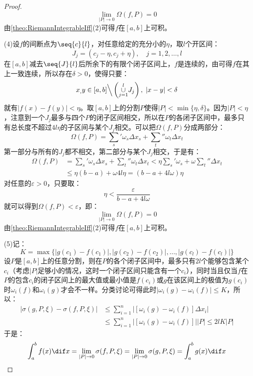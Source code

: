 \begin{proof}
\begin{equation*}
		\lim_{|P|\to0}\Omega(f,P)=0
	\end{equation*}
	由\cref{theo:RiemannIntegrableIff}(2)可得$f$在$[a,b]$上可积。\par
	(4)设$f$的间断点为$\seq{c}{l}$，对任意给定的充分小的$\eta$，取$l$个开区间：
	\begin{equation*}
		J_j=(c_j-\eta,c_j+\eta),\quad j=1,2,\dots,l
	\end{equation*}
	在$[a,b]$减去$\seq{J}{l}$后所余下的有限个闭子区间上，$f$是连续的，由可得$f$在其上一致连续，所以存在$\delta>0$，使得只要：
	\begin{equation*}
		x_,y\in[a,b]\Big\backslash\left(\underset{j=1}{\overset{l}{\cup}}J_j\right),\;|x-y|<\delta
	\end{equation*}
	就有$|f(x)-f(y)|<\eta$。取$[a,b]$上的分割$P$使得$|P|<\min\{\eta,\delta\}$。因为$|P|<\eta$，注意到一个$J_j$最多与四个$P$的闭子区间相交，所以在$P$的各闭子区间中，最多只有总长度不超过$4l\eta$的子区间与某个$J_j$相交。可以把$\Omega(f,P)$分成两部分：
	\begin{equation*}
		\Omega(f,P)=\sum_s'\omega_s\Delta x_s+\sum_t''\omega_t\Delta x_t
	\end{equation*}
	第一部分与所有的$J_j$都不相交，第二部分与某个$J_j$相交，于是有：
	\begin{align*}
		\Omega(f,P)&=\sum_s'\omega_s\Delta x_s+\sum_t''\omega_t\Delta x_t<\eta\sum_{s}'\omega_s+\omega\sum_{t}''\Delta x_t \\
		&\leqslant\eta(b-a)+\omega4l\eta=(b-a+4l\omega)\eta
	\end{align*}
	对任意的$\varepsilon>0$，只要取：
	\begin{equation*}
		\eta<\frac{\varepsilon}{b-a+4l\omega}
	\end{equation*}
	就可以得到$\Omega(f,P)<\varepsilon$，即：
	\begin{equation*}
		\lim_{|P|\to0}\Omega(f,P)=0
	\end{equation*}
	由\cref{theo:RiemannIntegrableIff}(2)可得$f$在$[a,b]$上可积。\par
	(5)记：
	\begin{equation*}
		K=\max\{|g(c_1)-f(c_1)|,|g(c_2)-f(c_2)|,\dots,|g(c_l)-f(c_l)|\}
	\end{equation*}
	设$P$是$[a,b]$上的任意分割，则在$P$的各个闭子区间中，最多只有$2l$个能够包含某个$c_i$（考虑$|P|$足够小的情况，这时一个闭子区间只能含有一个$c_i$），同时当且仅当$f$在$P$的包含$c_i$的闭子区间上的最大值或最小值是$f(c_i)$或$g$在该区间上的极值为$g(c_i)$时$\omega_i(f)$和$\omega_i(g)$才会不一样。分类讨论可得此时$|\omega_i(g)-\omega_i(f)|\leqslant K$，所以：
	\begin{align*}
		|\sigma(g,P,\xi)-\sigma(f,P,\xi)|&\leqslant\sum_{i=1}^{n}|[\omega_i(g)-\omega_i(f)]\Delta x_i| \\
		&\leqslant\sum_{i=1}^{n}|[\omega_i(g)-\omega_i(f)]||P|\leqslant2lK|P|
	\end{align*}
	于是：
	\begin{equation*}
		\int_{a}^bf(x)\dif x=\lim_{|P|\to0}\sigma(f,P,\xi)=\lim_{|P|\to0}\sigma(g,P,\xi)=\int_{a}^bg(x)\dif x\qedhere
	\end{equation*}
\end{proof}


